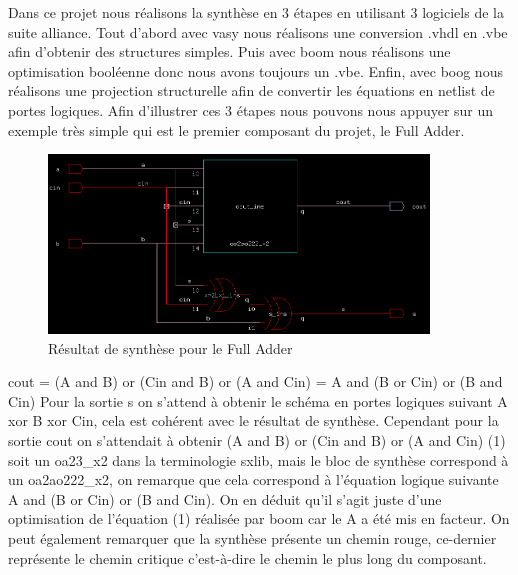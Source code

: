 \documentclass[10pt,a4paper]{article}
\begin{document}
			Dans ce projet nous réalisons la synthèse en 3 étapes en utilisant 3 logiciels de la suite alliance. 
			Tout d’abord avec vasy nous réalisons une conversion .vhdl en .vbe afin d’obtenir des structures 
			simples. Puis avec boom nous réalisons une optimisation booléenne donc nous avons toujours un .vbe. 
			Enfin, avec boog nous réalisons une projection structurelle afin de convertir les équations en 
			netlist de portes logiques. Afin d’illustrer ces 3 étapes nous pouvons nous appuyer sur un exemple 
			très simple qui est le premier composant du projet, le Full Adder.
		
			\begin{figure}[H]															%
				\centering 																%
				\includegraphics[width=0.9\textwidth]{full_adder_XSCH.png} 				%
				\caption{Résultat de synthèse pour le Full Adder} 						%
				\label{Fig.main2} 														%
			\end{figure}

			cout = (A and B) or (Cin and B) or (A and Cin) = A and (B or Cin) or (B and Cin) 
			Pour la sortie s on s'attend à obtenir le schéma en portes logiques suivant A xor B xor Cin, cela 
			est cohérent avec le résultat de synthèse. Cependant pour la sortie cout on s'attendait à obtenir 
			(A and B) or (Cin and B) or (A and Cin) (1) soit un oa23\_x2 dans la terminologie sxlib, 
			mais le bloc de synthèse correspond à un oa2ao222\_x2, on remarque que cela correspond à 
			l'équation logique suivante A and (B or Cin) or (B and Cin). On en déduit qu'il s'agit juste 
			d'une optimisation de l'équation (1) réalisée par boom car le A a été mis en facteur. On peut 
			également remarquer que la synthèse présente un chemin rouge, ce-dernier représente le chemin 
			critique c'est-à-dire le chemin le plus long du composant.
			
\end{document}
